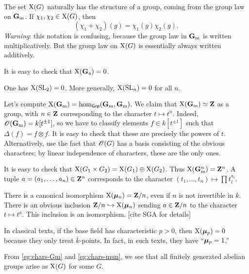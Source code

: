 The set $\operatorname{X}(G)$ naturally has the structure of a group, coming from 
the group law on $\mathbf{G}_\mathrm{m}$. If $\chi_1,\chi_2\in \operatorname{X}(G)$, then 
\[
  (\chi_1+\chi_2)(g) = \chi_1(g)\chi_2(g) .
\]
\emph{Warning}: this notation is confusing, because the group law in $\mathbf{G}_\mathrm{m}$ is 
written multiplicatively. But the group law on $\operatorname{X}(G)$ is essentially 
always written additively. 

\begin{example}
It is easy to check that $\operatorname{X}(\mathbf{G}_\mathrm{a})=0$. 
\end{example}

\begin{example}
One has $\operatorname{X}(\operatorname{SL}_2)=0$. More generally, $\operatorname{X}(\operatorname{SL}_n)=0$ for all 
$n$. 
\end{example}

\begin{example}\label{eg:chars-Gm}
Let's compute $\operatorname{X}(\mathbf{G}_\mathrm{m})=\hom_{\mathsf{Grp}}(\mathbf{G}_\mathrm{m},\mathbf{G}_\mathrm{m})$. We claim that 
$\operatorname{X}(\mathbf{G}_\mathrm{m})\simeq \mathbf{Z}$ as a group, with $n\in \mathbf{Z}$ corresponding to the 
character $t\mapsto t^n$. Indeed, $\mathscr{O}(\mathbf{G}_\mathrm{m})=k[t^{\pm 1}]$, so we have to 
classify elements $f\in k[t^{\pm 1}]$ such that $\Delta(f)=f\otimes f$. It is 
easy to check that these are precisely the powers of $t$. Alternatively, use 
the fact that $\mathscr{O}(G)$ has a basis consisting of the obvious characters; by 
linear independence of characters, these are the only ones. 
\end{example}

It is easy to check that 
$\operatorname{X}(G_1\times G_2)=\operatorname{X}(G_1)\oplus \operatorname{X}(G_2)$. Thus 
$\operatorname{X}(\mathbf{G}_\mathrm{m}^n) = \mathbf{Z}^n$. A tuple $a=(a_1,\dots,a_n)\in \mathbf{Z}^n$ corresponds 
to the character $(t_1,\dots,t_n)\mapsto \prod t_i^{a_i}$. 

\begin{example}\label{eg:chars-mun}
There is a canonical isomorphism $\operatorname{X}(\bm{\mu}_n)=\mathbf{Z}/n$, even if 
$n$ is not invertible in $k$. There is an obvious inclusion 
$\mathbf{Z}/n\hookrightarrow \operatorname{X}(\bm{\mu}_n)$ sending $a\in \mathbf{Z}/n$ to the character 
$t\mapsto t^a$. This inclusion is an isomorphism. [cite SGA for details]
\end{example}

In classical texts, if the base field has characteristic $p>0$, then 
$\operatorname{X}(\bm{\mu}_p)=0$ because they only treat $\bar k$-points. In fact, in 
such texts, they have ``$\bm{\mu}_p=1$.'' 

From \autoref{eg:chars-Gm} and \autoref{eg:chars-mun}, we see that all finitely 
generated abelian groups arise as $\operatorname{X}(G)$ for some $G$. 

